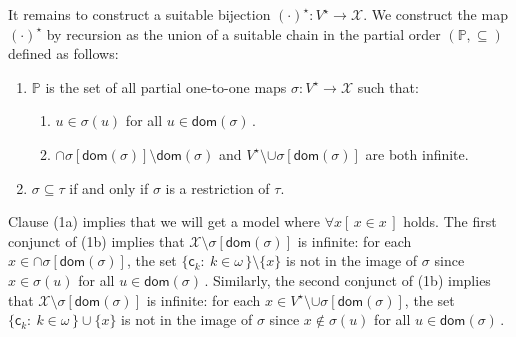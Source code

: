 \documentclass[10pt,a4paper, openany,  oldfontcommands]{memoir}
\newtheorem{open problem} [theorem] {Open Problem}
\begin{document}
It remains to construct a suitable  bijection    $  (  \cdot )^{  \star }   :  V^{  \star }     \to        \mathcal{X}   $. 
We construct the map  $  (  \cdot )^{  \star }    $ by recursion as   the union of a suitable chain in 
 the   partial order $  \left(   \mathbb{P}   ,  \subseteq       \right)    $   defined as follows: 
 \begin{enumerate}
 \item    $   \mathbb{P}   $   is the set  of all partial one-to-one maps   $    \sigma :  V^{  \star }  \to   \mathcal{X}   $  such that: 
 \begin{enumerate}
\item    $    u  \in  \sigma (u)     $   for all  $   u   \in   \mathsf{dom} \left(  \sigma  \right)        \,     $.
 

 \item     $ \cap    \sigma  \left[   \mathsf{dom} \left(  \sigma  \right)    \right]    \setminus    \mathsf{dom} \left(  \sigma  \right)    $
 and  
   $ V^{  \star }  \setminus   \cup    \sigma  \left[   \mathsf{dom} \left(  \sigma  \right)    \right]    $
 are both infinite. 
  \end{enumerate}
 
 
 \item  $  \sigma  \subseteq  \tau $   if and only if  $  \sigma $ is a restriction of  $  \tau $. 
\end{enumerate}  
Clause (1a)   implies that  we will get a model where    $    \forall x  \left[  \,   x  \in  x  \,  \right]       $   holds. 
The first conjunct of (1b) implies that   $   \mathcal{X} \setminus  \sigma  \left[   \mathsf{dom} \left(  \sigma  \right)    \right]  $  is infinite: 
 for  each $ x  \in   \cap    \sigma  \left[   \mathsf{dom} \left(  \sigma  \right)    \right]    $, 
the set  $  \lbrace  \mathsf{c}_k :  \   k  \in  \omega   \,  \rbrace   \setminus  \lbrace x  \rbrace   $  
is not in the image of  $  \sigma   $  
since  $  x  \in  \sigma (u )   $   for all $  u  \in     \mathsf{dom} \left(  \sigma  \right)      \,     $. 
Similarly, the second   conjunct of (1b) implies that   
$   \mathcal{X} \setminus  \sigma  \left[   \mathsf{dom} \left(  \sigma  \right)    \right]  $   is infinite: 
 for  each $ x  \in   V^{  \star }  \setminus   \cup    \sigma  \left[   \mathsf{dom} \left(  \sigma  \right)    \right]    $, 
the set  $  \lbrace  \mathsf{c}_k :  \   k  \in  \omega   \,  \rbrace   \cup  \lbrace x  \rbrace   $  
is not in the image of  $  \sigma  $
since  $  x   \not\in  \sigma (u )   $   for all $  u  \in     \mathsf{dom} \left(  \sigma  \right)      \,     $. 
\end{document}
